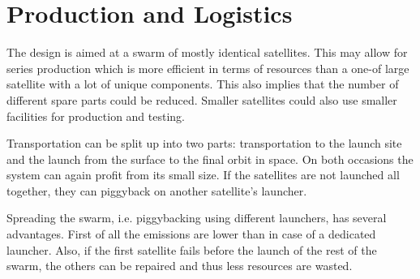 \section{Production and Logistics}
\label{SSPRO}

The design is aimed at a swarm of mostly identical satellites. This may allow for series production which is more efficient in terms of resources than a one-of large satellite with a lot of unique components. This also implies that the number of different spare parts could be reduced. Smaller satellites could also use smaller facilities for production and testing. 

Transportation can be split up into two parts: transportation to the launch site and the launch from the surface to the final orbit in space. On both occasions the system can again profit from its small size. If the satellites are not launched all together, they can piggyback on another satellite's launcher.

Spreading the swarm, i.e. piggybacking using different launchers, has several advantages. First of all the emissions are lower than in case of a dedicated launcher. Also, if the first satellite fails before the launch of the rest of the swarm, the others can be repaired and thus less resources are wasted.